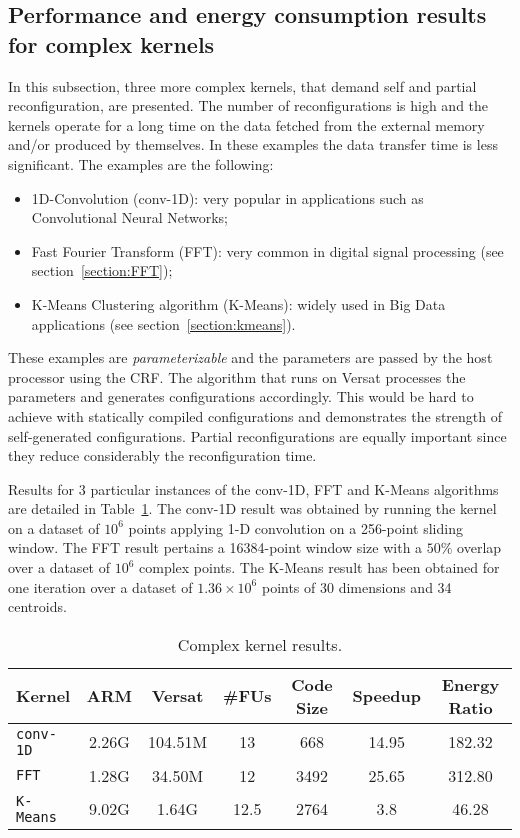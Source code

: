 \subsection{Performance and energy consumption results for complex kernels}
\label{subsection:ResultsComplexKernels}

In this subsection, three more complex kernels, that demand self and
partial reconfiguration, are presented. The number of reconfigurations
is high and the kernels operate for a long time on the data fetched
from the external memory and/or produced by themselves. In these
examples the data transfer time is less significant. The examples are
the following:
\begin{itemize}
\item 1D-Convolution (conv-1D): very popular in applications such as
  Convolutional Neural Networks;
\item Fast Fourier Transform (FFT): very common in digital signal
  processing (see section~\ref{section:FFT});
\item K-Means Clustering algorithm (K-Means): widely used in Big Data
  applications (see section~\ref{section:kmeans}).
\end{itemize}

These examples are {\em parameterizable} and the parameters are passed
by the host processor using the CRF. The algorithm that runs on Versat
processes the parameters and generates configurations
accordingly. This would be hard to achieve with statically compiled
configurations and demonstrates the strength of self-generated
configurations. Partial reconfigurations are equally important
since they reduce considerably the reconfiguration time.

Results for 3 particular instances of the conv-1D, FFT and K-Means
algorithms are detailed in Table~\ref{tabExecR2}. The conv-1D result
was obtained by running the kernel on a dataset of $10^6$ points
applying 1-D convolution on a 256-point sliding window. The FFT result
pertains a 16384-point window size with a $50\%$ overlap over a
dataset of $10^6$ complex points. The K-Means result has been obtained
for one iteration over a dataset of $1.36 \times 10^6$ points of 30
dimensions and 34 centroids.

\begin{table}[!htb]
  \renewcommand{\arraystretch}{1.2} %
  \caption{Complex kernel results.}
  \label{tabExecR2}
  \centering
  \begin{tabular}{lcccccc}
    \toprule
    Kernel & ARM & Versat & \#FUs & Code Size & Speedup & Energy Ratio\\
    \midrule
    {\tt conv-1D} & 2.26G & 104.51M & 13   &  668 & 14.95 & 182.32\\
    {\tt FFT}     & 1.28G &  34.50M & 12   & 3492 & 25.65 & 312.80\\
    {\tt K-Means} & 9.02G &   1.64G & 12.5 & 2764 &  3.8  &  46.28\\
    \bottomrule
  \end{tabular}
\end{table}

